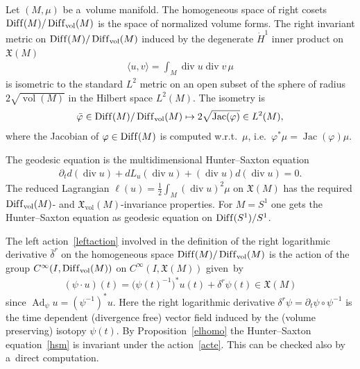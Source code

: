 \documentclass[pdftex]{sigma}
\numberwithin{equation}{section}
\begin{document}
\begin{Example}
\label{ex:HS}
Let $(M,\mu)$ be a~volume manifold.
The homogeneous space of right cosets $\operatorname{Dif\/f}(M)/\operatorname{Dif\/f}_{\operatorname{vol}}(M)$ is the space
of normalized volume forms.
The right invariant metric on $\operatorname{Dif\/f}(M)/\operatorname{Dif\/f}_{\operatorname{vol}}(M)$ induced by the
degenerate $\dot H^1$ inner product on $\mathfrak X(M)$
\begin{gather*}
\langle u,v\rangle=\int_M\operatorname{div} u\operatorname{div} v\, \mu
\end{gather*}
is isometric to the standard $L^2$ metric on an open subset of the sphere of radius $2\sqrt{\operatorname{vol}(M)}$ in
the Hilbert space $L^2(M)$.
The isometry is
\begin{gather*}
\bar\varphi\in\operatorname{Dif\/f}(M)/\operatorname{Dif\/f}_{\operatorname{vol}}(M)\mapsto
2\sqrt{\operatorname{Jac}(\varphi)}\in L^2(M),
\end{gather*}
where the Jacobian of $\varphi\in\operatorname{Dif\/f}(M)$ is computed w.r.t.~$\mu$, i.e.\
$\varphi^*\mu=\operatorname{Jac}(\varphi)\mu$.

The geodesic equation is the {multidimensional Hunter--Saxton} equation
\begin{gather}
\label{hsm}
\partial_t d(\operatorname{div} u)+d L_u (\operatorname{div} u)+(\operatorname{div} u) d(\operatorname{div} u)=0.
\end{gather}
The reduced Lagrangian $ \ell(u)=\frac12\int_M(\operatorname{div} u)^2\mu$ on $\mathfrak X(M)$ has the required
$\operatorname{Dif\/f}_{\operatorname{vol}}(M)$- and $\mathfrak X_{\operatorname{vol}}(M)$-invariance properties.
For $M=S^1$ one gets the Hunter--Saxton equation as geodesic equation on $\operatorname{Dif\/f}(S^1)/S^1$.

The left action~\eqref{leftaction} involved in the def\/inition of the right logarithmic derivative $\bar\delta^r$ on the
ho\-mo\-ge\-neous space $\operatorname{Dif\/f}(M)/\operatorname{Dif\/f}_{\operatorname{vol}}(M)$ is the action of the group
$C^{\infty}(I{,}\operatorname{Dif\/f}_{\operatorname{vol}}(M))$ on $C^{\infty}(I{,}\mathfrak X(M))$ given~by
\begin{gather}
\label{acte}
(\psi\cdot u)(t)=\big(\psi(t)^{-1}\big)^*u(t)+\delta^r\psi(t)\in\mathfrak X(M)
\end{gather}
since $\operatorname{Ad}_\psi u=(\psi^{-1})^*u$.
Here the right logarithmic derivative $\delta^r\psi=\partial_t\psi\circ\psi^{-1}$ is the time dependent (divergence
free) vector f\/ield induced by the (volume preserving) isotopy $\psi(t)$.
By Proposition~\ref{elhomo} the Hunter--Saxton equation~\eqref{hsm} is invariant under the action~\eqref{acte}.
This can be checked also by a~direct computation.
\end{Example}
\end{document}
